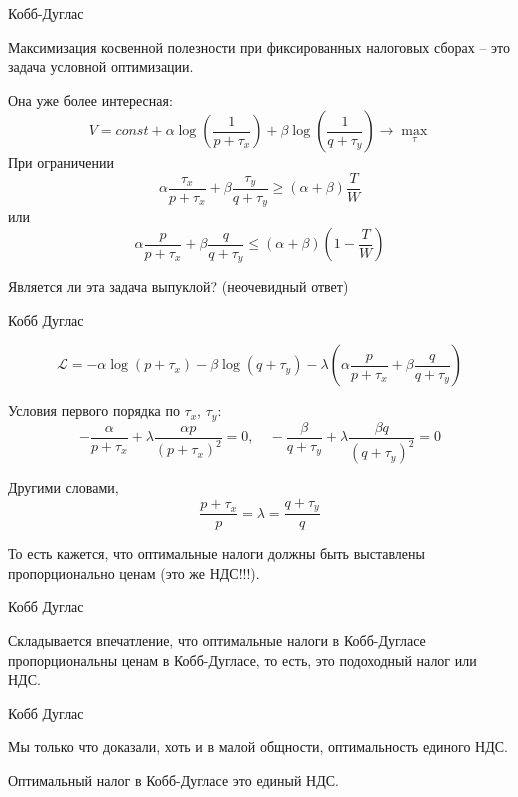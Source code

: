 \documentclass{beamer}
\begin{document}
\begin{frame}{Кобб-Дуглас}

Максимизация косвенной полезности при фиксированных налоговых сборах – это задача условной оптимизации. 

Она уже более интересная:
$$ V = const + \alpha \log(\frac{1}{p + \tau_x}) + \beta \log (\frac{1}{q + \tau_y}) \to \max_{\tau}$$
При ограничении $$\alpha \frac{\tau_x}{p+\tau_x} + \beta \frac{\tau_y}{q+\tau_y} \geqslant (\alpha + \beta)\frac{T}{W}$$
или
$$\alpha \frac{p}{p+\tau_x} + \beta \frac{q}{q+\tau_y} \leqslant (\alpha + \beta)(1-\frac{T}{W})$$

Является ли эта задача выпуклой? (неочевидный ответ)

\end{frame}

\begin{frame}{Кобб Дуглас}

$$ \mathcal{L} = - \alpha \log(p + \tau_x) - \beta \log (q + \tau_y) - \lambda (\alpha \frac{p}{p+\tau_x} + \beta \frac{q}{q+\tau_y})$$

Условия первого порядка по $\tau_x$, $\tau_y$:
$$ - \frac{\alpha}{p + \tau_x} + \lambda \frac{\alpha p}{(p + \tau_x)^2} = 0, \quad - \frac{\beta}{q + \tau_y} + \lambda \frac{\beta q}{(q + \tau_y)^2} = 0$$

Другими словами,
$$\frac{p + \tau_x}{p} = \lambda = \frac{q + \tau_y}{q}$$

То есть кажется, что оптимальные налоги должны быть выставлены пропорционально ценам (это же НДС!!!). 

\end{frame}

%
%
%

\begin{frame}{Кобб Дуглас}

Складывается впечатление, что оптимальные налоги в Кобб-Дугласе пропорциональны ценам в Кобб-Дугласе, то есть, это подоходный налог или НДС.

\end{frame}

\begin{frame}{Кобб Дуглас}

Мы только что доказали, хоть и в малой общности, оптимальность единого НДС.

\begin{lemma}
Оптимальный налог в Кобб-Дугласе это единый НДС.
\end{lemma}

\end{frame}
\end{document}
